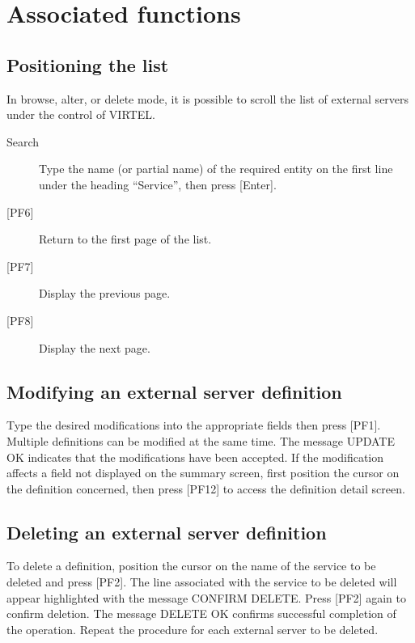 \documentclass[letterpaper,10pt,english]{sphinxmanual}
\begin{document}



\section{Associated functions}
\label{\detokenize{connectivity_guide:id23}}

\subsection{Positioning the list}
\label{\detokenize{connectivity_guide:id24}}
In browse, alter, or delete mode, it is possible to scroll the list of external servers under the control of VIRTEL.
\begin{description}
\item[{Search}] \leavevmode
Type the name (or partial name) of the required entity on the first line under the heading “Service”, then press {[}Enter{]}.

\item[{{[}PF6{]}}] \leavevmode
Return to the first page of the list.

\item[{{[}PF7{]}}] \leavevmode
Display the previous page.

\item[{{[}PF8{]}}] \leavevmode
Display the next page.

\end{description}


\subsection{Modifying an external server definition}
\label{\detokenize{connectivity_guide:modifying-an-external-server-definition}}
Type the desired modifications into the appropriate fields then press {[}PF1{]}. Multiple definitions can be modified at the same time. The message UPDATE OK indicates that the modifications have been accepted. If the modification affects a field not displayed on the summary screen, first position the cursor on the definition concerned, then press {[}PF12{]} to
access the definition detail screen.


\subsection{Deleting an external server definition}
\label{\detokenize{connectivity_guide:deleting-an-external-server-definition}}
To delete a definition, position the cursor on the name of the service to be deleted and press {[}PF2{]}. The line associated with the service to be deleted will appear highlighted with the message CONFIRM DELETE. Press {[}PF2{]} again to confirm deletion. The message DELETE OK confirms successful completion of the operation. Repeat the procedure for each
external server to be deleted.
\end{document}
